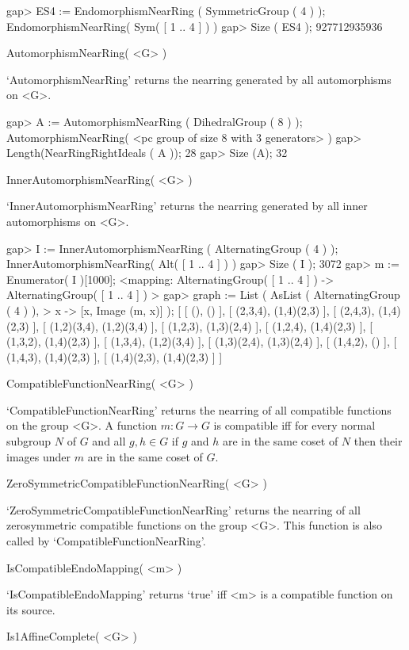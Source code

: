 \beginexample
    gap> ES4 := EndomorphismNearRing ( SymmetricGroup ( 4 ) );
    EndomorphismNearRing( Sym( [ 1 .. 4 ] ) )
    gap> Size ( ES4 );
    927712935936
\endexample

\>AutomorphismNearRing( <G> )

`AutomorphismNearRing' returns the nearring generated by all automorphisms
on <G>.

\beginexample
    gap> A := AutomorphismNearRing ( DihedralGroup ( 8 ) );
    AutomorphismNearRing( <pc group of size 8 with 3 generators> )
    gap> Length(NearRingRightIdeals ( A ));
    28
    gap> Size (A);
    32
\endexample

\>InnerAutomorphismNearRing( <G> )

`InnerAutomorphismNearRing' returns the nearring generated by all inner
automorphisms on <G>.

\beginexample
    gap> I := InnerAutomorphismNearRing ( AlternatingGroup ( 4 ) );
    InnerAutomorphismNearRing( Alt( [ 1 .. 4 ] ) )
    gap> Size ( I );
    3072
    gap> m := Enumerator( I )[1000];
    <mapping: AlternatingGroup( [ 1 .. 4 ] ) -> AlternatingGroup( [ 1 .. 4 ] ) >
    gap> graph := List ( AsList ( AlternatingGroup ( 4 ) ),
    > x -> [x, Image (m, x)] );
    [ [ (), () ], [ (2,3,4), (1,4)(2,3) ], [ (2,4,3), (1,4)(2,3) ],
      [ (1,2)(3,4), (1,2)(3,4) ], [ (1,2,3), (1,3)(2,4) ],
      [ (1,2,4), (1,4)(2,3) ], [ (1,3,2), (1,4)(2,3) ], [ (1,3,4), (1,2)(3,4) ],
      [ (1,3)(2,4), (1,3)(2,4) ], [ (1,4,2), () ], [ (1,4,3), (1,4)(2,3) ],
      [ (1,4)(2,3), (1,4)(2,3) ] ]
\endexample

\>CompatibleFunctionNearRing( <G> )

`CompatibleFunctionNearRing' returns the nearring of all compatible functions
on the group <G>. A function $m:G \rightarrow G$ is compatible iff for every normal
subgroup $N$ of $G$ and all $g,h \in G$ if $g$ and $h$ are in the same coset of $N$
then their images under $m$ are in the same coset of $G$.

\>ZeroSymmetricCompatibleFunctionNearRing( <G> )

`ZeroSymmetricCompatibleFunctionNearRing' returns the nearring of all zerosymmetric
compatible functions on the group <G>. This function is also called by 
`CompatibleFunctionNearRing'.

\>IsCompatibleEndoMapping( <m> )

`IsCompatibleEndoMapping' returns `true' iff <m> is a compatible function on its 
source.

\>Is1AffineComplete( <G> )

